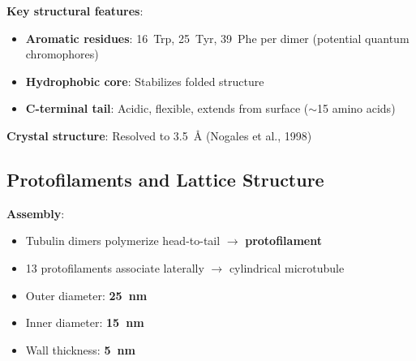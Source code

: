 \textbf{Key structural features}:
\begin{itemize}
\item \textbf{Aromatic residues}: 16~Trp, 25~Tyr, 39~Phe per dimer (potential quantum chromophores)
\item \textbf{Hydrophobic core}: Stabilizes folded structure
\item \textbf{C-terminal tail}: Acidic, flexible, extends from surface ($\sim$15 amino acids)
\end{itemize}

\textbf{Crystal structure}: Resolved to 3.5~Å (Nogales et al., 1998)

\subsection{Protofilaments and Lattice Structure}
\label{subsec:protofilaments-lattice}

\textbf{Assembly}:
\begin{itemize}
\item Tubulin dimers polymerize head-to-tail $\rightarrow$ \textbf{protofilament}
\item 13 protofilaments associate laterally $\rightarrow$ cylindrical microtubule
\item Outer diameter: \textbf{25~nm}
\item Inner diameter: \textbf{15~nm}
\item Wall thickness: \textbf{5~nm}
\end{itemize}

